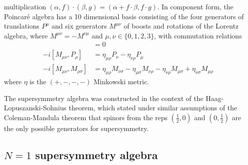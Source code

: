 multiplication $(\alpha,f) \cdot (\beta, g) = (\alpha + f\cdot \beta, f\cdot
g)$. 
In component form, the Poincar\'e algebra has a 10
dimensional basis consisting of the four generators of translations $P^{\mu}$
and six generators $M^{\mu\nu}$ of boosts and rotations of the Lorentz algebra,
where $M^{\mu\nu}=-M^{\nu\mu}$ and $\mu,\nu\in \{0,1,2,3\}$, with commutation relations
\begin{align*}
	[P_\mu, P_\nu] &= 0 \\
	-i[M_{\mu\nu}, P_{\rho}] &= \eta_{\mu\rho}P_{\nu} - \eta_{\nu\rho}P_{\mu} \\
	-i[M_{\mu\nu}, M_{\rho\sigma}] &= \eta_{\mu\rho}M_{\nu\sigma} -
	\eta_{\mu\sigma}M_{\nu\rho} - \eta_{\nu\rho}M_{\mu\sigma} +
	\eta_{\nu\sigma}M_{\mu\rho} 
\end{align*}
where $\eta$ is the  $(+,-,-,-)$ Minkowski metric.

The supersymmetry algebra was constructed in the context of the
Haag-Lopuszanski-Sohnius theorem, which stated under similar assumptions of the
Coleman-Mandula theorem that spinors from the reps $(\frac{1}{2},0)$ and
$(0,\frac{1}{2})$ are the only possible generators for supersymmetry. 
\begin{comment} %
	From the previous section, we know the Lorentz group admits two inequivalent 
	two-dimensional complex spin representations 2 and $\overline{2}$ whose tensor 
	product decomposes as $2\otimes\overline{2} \simeq 3 \oplus 1$, to give the
	adjoint representation. 
	Normally, we treat such a decomposition as relating to specific particles,
	e.g. the pion is a quark and anti-quark pair. However, we can also identify
	$3\oplus 1$ with Minkowski spacetime. 

	This leads to the question: if Minkowski spacetime belongs to the adjoint
	representation, can Poincar\'e symmetry be extended to the fundamental
	representation? 

	The physical appeal of this idea is that the fundamental representations
	correspond to fermions. 
	So far, however, the implied supersymmetry here,
	of a symmetry between spatial and fermionic directions, has not been seen
	experimentally in nature. 
\end{comment}


\subsection{\texorpdfstring{$N=1$}{N=1} supersymmetry algebra}

